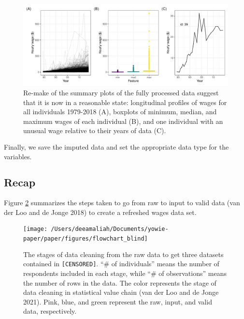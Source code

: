 \documentclass{article}
\begin{document}
\begin{figure}

{\centering \includegraphics[width=1\linewidth]{figures/fixed-feature-plot-1} 

}

\caption{Re-make of the summary plots of the fully processed data suggest that it is now in a reasonable state: longitudinal profiles of wages for all individuals 1979-2018 (A), boxplots of minimum, median, and maximum wages of each individual (B), and one individual with an unusual wage relative to their years of data (C). }\label{fig:fixed-feature-plot}
\end{figure}

Finally, we save the imputed data and set the appropriate data type for the variables.

\hypertarget{recap}{%
\subsection{Recap}\label{recap}}

Figure \ref{fig:flow-chart-blind} summarizes the steps taken to go from raw to input to valid data (van der Loo and de Jonge 2018) to create a refreshed wages data set.



\begin{figure}

{\centering \texttt{[image: /Users/deeamaliah/Documents/yowie-paper/paper/figures/flowchart\_blind]} 

}

\caption{The stages of data cleaning from the raw data to get three datasets contained in \texttt{[CENSORED]}. ``\# of individuals'' means the number of respondents included in each stage, while ``\# of observations'' means the number of rows in the data. The color represents the stage of data cleaning in statistical value chain (van der Loo and de Jonge 2021). Pink, blue, and green represent the raw, input, and valid data, respectively.}\label{fig:flow-chart-blind}
\end{figure}
\end{document}
